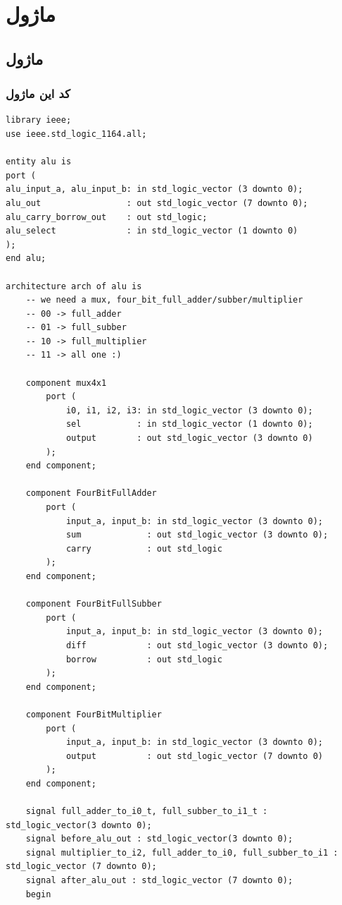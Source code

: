 \documentclass[dvipsnames, svgnames, x11names, a4paper, 11pt, oneside]{book}
\newcommand{\alu}{\lr{ALU}}
\begin{document}
		\chapter{ماژول \alu}
			\section{ماژول \alu}
				\subsection{کد این ماژول}
					\begin{latin}
						
						\begin{lstlisting}
library ieee;
use ieee.std_logic_1164.all;

entity alu is
port (
alu_input_a, alu_input_b: in std_logic_vector (3 downto 0);
alu_out                 : out std_logic_vector (7 downto 0);
alu_carry_borrow_out    : out std_logic;
alu_select              : in std_logic_vector (1 downto 0)
);
end alu;

architecture arch of alu is
	-- we need a mux, four_bit_full_adder/subber/multiplier
	-- 00 -> full_adder
	-- 01 -> full_subber
	-- 10 -> full_multiplier
	-- 11 -> all one :)
	
	component mux4x1
		port (
			i0, i1, i2, i3: in std_logic_vector (3 downto 0);
			sel           : in std_logic_vector (1 downto 0);
			output        : out std_logic_vector (3 downto 0)
		);
	end component;
	
	component FourBitFullAdder
		port (
			input_a, input_b: in std_logic_vector (3 downto 0);
			sum             : out std_logic_vector (3 downto 0);
			carry           : out std_logic
		);
	end component;
	
	component FourBitFullSubber
		port (
			input_a, input_b: in std_logic_vector (3 downto 0);
			diff            : out std_logic_vector (3 downto 0);
			borrow          : out std_logic
		);
	end component;
	
	component FourBitMultiplier
		port (
			input_a, input_b: in std_logic_vector (3 downto 0);
			output          : out std_logic_vector (7 downto 0)
		);
	end component;
	
	signal full_adder_to_i0_t, full_subber_to_i1_t : std_logic_vector(3 downto 0);
	signal before_alu_out : std_logic_vector(3 downto 0);
	signal multiplier_to_i2, full_adder_to_i0, full_subber_to_i1 : std_logic_vector (7 downto 0);
	signal after_alu_out : std_logic_vector (7 downto 0);
	begin
	

\end{lstlisting}
\end{latin}
\end{document}
